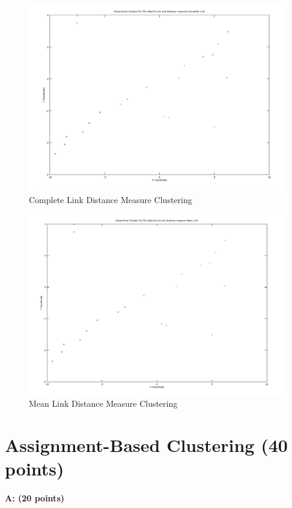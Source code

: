 \documentclass[11pt]{article}
\begin{document}
\begin{figure}[!htb]
\centering
\includegraphics[width=5in]{figures/1ACompleteLink.png}
\caption{Complete Link Distance Measure Clustering}
\label{CLC}
\end{figure}

\begin{figure}[!htb]
\centering
\includegraphics[width=5in]{figures/1AMeanLink.png}
\caption{Mean Link Distance Measure Clustering}
\label{MLC}
\end{figure}

\section{Assignment-Based Clustering (40 points)}

\paragraph{A: (20 points)} 
\end{document}
